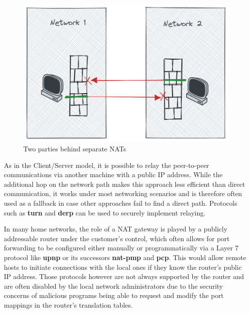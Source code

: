 \begin{figure}
\centering
\includegraphics[width=\textwidth,height=0.25\textheight]{thesis/../figures/nat-intro.png}
\caption{Two parties behind separate NATs\label{nat-intro}}
\end{figure}

As in the Client/Server model, it is possible to relay the peer-to-peer
communications via another machine with a public IP address. While the
additional hop on the network path makes this approach less efficient
than direct communication, it works under most networking scenarios and
is therefore often used as a fallback in case other approaches fail to
find a direct path. Protocols such as \textbf{\acrfull{turn}}
\autocite{turnRFC} and \textbf{\acrfull{derp}} \autocite{derpDocs} can
be used to securely implement relaying.

In many home networks, the role of a NAT gateway is played by a publicly
addressable router under the customer's control, which often allows for
port forwarding to be configured either manually or programmatically via
a Layer 7 protocol like \textbf{\gls{upnp}} or its successors
\textbf{\gls{nat-pmp}} and \textbf{\gls{pcp}}. This would allow remote
hosts to initiate connections with the local ones if they know the
router's public IP address. Those protocols however are not always
supported by the router and are often disabled by the local network
administrators due to the security concerns of malicious programs being
able to request and modify the port mappings in the router's translation
tables.

